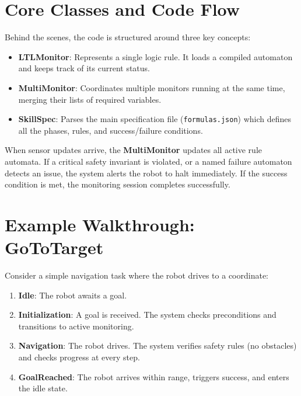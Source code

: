 \documentclass[11pt,a4paper]{article}
\begin{document}
\section{Core Classes and Code Flow}

Behind the scenes, the code is structured around three key concepts:
\begin{itemize}
    \item \textbf{LTLMonitor}: Represents a single logic rule. It loads a compiled automaton and keeps track of its current status.
    \item \textbf{MultiMonitor}: Coordinates multiple monitors running at the same time, merging their lists of required variables.
    \item \textbf{SkillSpec}: Parses the main specification file (\texttt{formulas.json}) which defines all the phases, rules, and success/failure conditions.
\end{itemize}

When sensor updates arrive, the \textbf{MultiMonitor} updates all active rule automata. If a critical safety invariant is violated, or a named failure automaton detects an issue, the system alerts the robot to halt immediately. If the success condition is met, the monitoring session completes successfully.

\section{Example Walkthrough: GoToTarget}

Consider a simple navigation task where the robot drives to a coordinate:
\begin{enumerate}
    \item \textbf{Idle}: The robot awaits a goal.
    \item \textbf{Initialization}: A goal is received. The system checks preconditions and transitions to active monitoring.
    \item \textbf{Navigation}: The robot drives. The system verifies safety rules (no obstacles) and checks progress at every step.
    \item \textbf{GoalReached}: The robot arrives within range, triggers success, and enters the idle state.
\end{enumerate}
\end{document}

